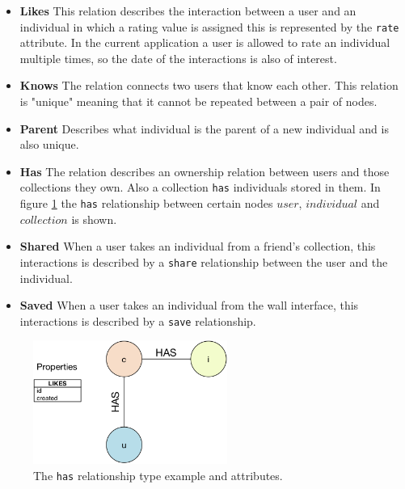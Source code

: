 \documentclass[conference]{IEEEtran}
\begin{document}
\begin{itemize}
\item {\bf Likes} This relation describes the interaction between a user and
an individual in which a rating value is assigned this is represented by 
the {\tt rate} attribute. In the current application a user is allowed to rate
an individual multiple times, so the date of the interactions is also of
interest.

\item {\bf Knows} The relation connects two users that know each
other. This relation is "unique" meaning that it cannot be repeated
between a pair of nodes.  %

\item {\bf Parent} Describes what individual is the parent of a new
  individual and is also unique. 

\item {\bf Has} The relation describes an ownership relation between users and
those collections they own. Also a collection {\tt has}  individuals stored
in them.  In figure \ref{fig:has} the {\tt has} relationship 
between certain nodes $user$, $individual$ and $collection$ is shown.

\item {\bf Shared} When a user takes an individual from a friend's collection, this interactions 
is described by a {\tt share} relationship between the user and the
individual.  %

\item {\bf Saved} When a user takes an individual from the wall interface, this 
interactions is described by a {\tt save} relationship. 
\end{itemize}

  
\begin{figure}[!t]
    \centering
        \includegraphics[width=2.5in]{img/edge_properties_has.png}
    \caption{ The {\tt has} relationship type example and attributes.}
    \label{fig:has}
\end{figure}
\end{document}

